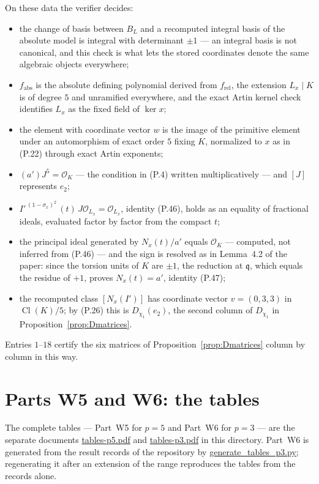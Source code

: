\documentclass[11pt]{article}
\newcommand{\Cl}{\operatorname{Cl}}
\providecommand{\nolinkurl}[1]{\url{#1}}
\begin{document}
On these data the verifier decides:
\begin{itemize}
\item the change of basis between $B_L$ and a recomputed integral
  basis of the absolute model is integral with determinant $\pm1$
  --- an integral basis is not canonical, and this check is what
  lets the stored coordinates denote the same algebraic objects
  everywhere;
\item $f_{\mathrm{abs}}$ is the absolute defining polynomial
  derived from $f_{\mathrm{rel}}$, the extension $L_x\mid K$ is
  of degree $5$ and unramified everywhere, and the exact Artin
  kernel check identifies $L_x$ as the fixed field of $\ker x$;
\item the element with coordinate vector $w$ is the image of the
  primitive element under an automorphism of exact order $5$
  fixing $K$, normalized to $x$ as in (P.22) through
  exact Artin exponents;
\item $(a')J^5=\mathcal O_K$ --- the condition in (P.4) written
  multiplicatively --- and $[J]$ represents $e_2$;
\item $I'^{\,(1-\sigma_x)^2}\,(t)\,J\mathcal O_{L_x}
  =\mathcal O_{L_x}$, identity (P.46), holds as an equality of
  fractional ideals, evaluated factor by factor from the compact
  $t$;
\item the principal ideal generated by $N_x(t)/a'$ equals
  $\mathcal O_K$ --- computed, not inferred from (P.46) --- and
  the sign is resolved as in Lemma~4.2 of the paper: since the
  torsion units of $K$ are $\pm1$, the reduction at
  $\mathfrak q$, which equals the residue of $+1$, proves
  $N_x(t)=a'$, identity (P.47);
\item the recomputed class $[N_x(I')]$ has coordinate vector
  $v=(0,3,3)$ in $\Cl(K)/5$; by (P.26) this is
  $D_{\chi_1}(e_2)$, the second column of $D_{\chi_1}$ in
  Proposition~\ref{prop:Dmatrices}.
\end{itemize}

Entries $1$--$18$ certify the six matrices of Proposition~\ref{prop:Dmatrices}
column by column in this way.

\section*{Parts W5 and W6: the tables}

The complete tables --- Part~W5 for $p=5$ and Part~W6 for $p=3$ ---
are the separate documents \nolinkurl{tables-p5.pdf} and
\nolinkurl{tables-p3.pdf} in this directory.  Part~W6 is generated
from the result records of the repository by
\nolinkurl{generate_tables_p3.py}; regenerating it after an
extension of the range reproduces the tables from the records
alone.
\end{document}
